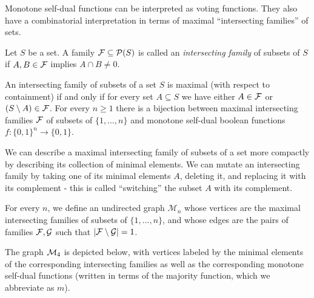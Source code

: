 \documentclass[letterpaper,11pt]{article}
\begin{document}
Monotone self-dual functions can be interpreted as voting functions. They also have a combinatorial interpretation in terms of maximal ``intersecting families'' of sets.

\begin{defn} Let $S$ be a set. A family $\mathcal{F}\subseteq \mathcal{P}(S)$ is called an \emph{intersecting family} of subsets of $S$ if $A,B\in \mathcal{F}$ implies $A\cap B\ne 0$.
\end{defn}

\begin{prop} An intersecting family of subsets of a set $S$ is maximal (with respect to containment) if and only if for every set $A\subseteq S$ we have either $A\in\mathcal{F}$ or $(S\setminus A)\in\mathcal{F}$. For every $n\ge 1$ there is a bijection between maximal intersecting families $\mathcal{F}$ of subsets of $\{1,...,n\}$ and monotone self-dual boolean functions $f:\{0,1\}^n\rightarrow \{0,1\}$.
\end{prop}

We can describe a maximal intersecting family of subsets of a set more compactly by describing its collection of minimal elements. We can mutate an intersecting family by taking one of its minimal elements $A$, deleting it, and replacing it with its complement - this is called ``switching'' the subset $A$ with its complement.

\begin{defn} For every $n$, we define an undirected graph $\mathcal{M}_n$ whose vertices are the maximal intersecting families of subsets of $\{1,...,n\}$, and whose edges are the pairs of families $\mathcal{F}, \mathcal{G}$ such that $|\mathcal{F} \setminus \mathcal{G}| = 1$.
\end{defn}

The graph $\mathcal{M}_4$ is depicted below, with vertices labeled by the minimal elements of the corresponding intersecting families as well as the corresponding monotone self-dual functions (written in terms of the majority function, which we abbreviate as $m$).
\end{document}
